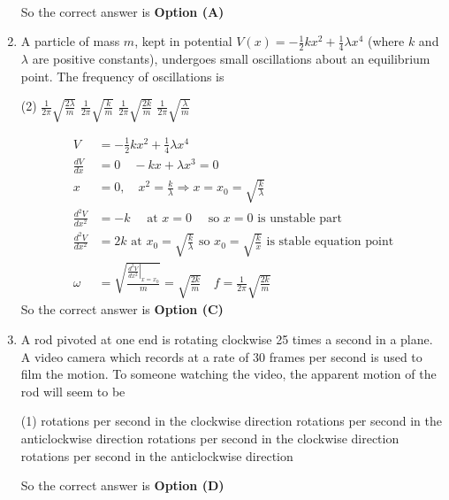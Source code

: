 \begin{enumerate}
\begin{answer}
\begin{align*}
\end{align*}
So the correct answer is \textbf{Option (A)}
\end{answer}
	\item A particle of mass $m$, kept in potential $V(x)=-\frac{1}{2} k x^{2}+\frac{1}{4} \lambda x^{4}$ (where $k$ and $\lambda$ are positive constants), undergoes small oscillations about an equilibrium point. The frequency of oscillations is
	{}
\begin{tasks}(2)
\task[\textbf{A.}] $\frac{1}{2 \pi} \sqrt{\frac{2 \lambda}{m}}$
\task[\textbf{B.}] $\frac{1}{2 \pi} \sqrt{\frac{k}{m}}$
\task[\textbf{C.}] $\frac{1}{2 \pi} \sqrt{\frac{2 k}{m}}$
\task[\textbf{D.}] $\frac{1}{2 \pi} \sqrt{\frac{\lambda}{m}}$
\end{tasks}
\begin{answer}
\begin{align*}
V&=-\frac{1}{2} k x^{2}+\frac{1}{4} \lambda x^{4}\\
\frac{d V}{d x}&=0 \quad-k x+\lambda x^{3}=0\\
x&=0, \quad x^{2}=\frac{k}{\lambda} \Rightarrow x=x_{0}=\sqrt{\frac{k}{\lambda}}\\
\frac{d^{2} V}{d x^{2}}&=-k \quad\text{ at $x=0 \quad$ so $x=0$ is unstable part}\\
\frac{d^{2} V}{d x^{2}}&=2 k\text{ at $x_{0}=\sqrt{\frac{k}{\lambda}}$ so $x_{0}=\sqrt{\frac{k}{x}}$ is stable equation point}\\
\omega&=\sqrt{\frac{\left.\frac{d^{2} V}{d x^{2}}\right|_{x=x_{0}}}{m}}=\sqrt{\frac{2 k}{m}} \quad f=\frac{1}{2 \pi} \sqrt{\frac{2 k}{m}}
\end{align*}
So the correct answer is \textbf{Option (C)}
\end{answer}
	\item A rod pivoted at one end is rotating clockwise 25 times a second in a plane. A video camera which records at a rate of 30 frames per second is used to film the motion. To someone watching the video, the apparent motion of the rod will seem to be
{	}
\begin{tasks}(1)
 rotations per second in the clockwise direction
 rotations per second in the anticlockwise direction
 rotations per second in the clockwise direction
 rotations per second in the anticlockwise direction
\end{tasks}
\begin{answer}
So the correct answer is \textbf{Option (D)}

\end{answer}
\end{enumerate}
